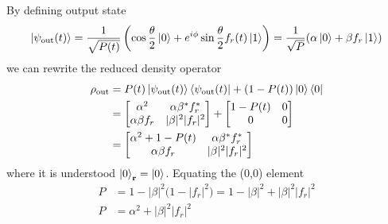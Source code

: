 \documentclass[../../../main.tex]{subfiles}
\begin{document}
By defining output state
\begin{equation*}
  \ket{\psi_{\text{out}}(t)} = \frac{1}{\sqrt{P(t)}}\left(\cos\frac{\theta}{2} \ket{0} + e^{i\phi}\sin\frac{\theta}{2}f_r(t)\ket{1}\right) = \frac{1 }{\sqrt{P}} (\alpha \ket{0 }+\beta f_r \ket{1})
\end{equation*}
we can rewrite the reduced density operator
\begin{align*}
  \rho_\text{out}
   & =  P(t) \ket{\psi_{\text{out}}(t)} \bra{\psi_{\text{out}}(t)} + (1-P(t)) \ket{0} \bra{0} \\
   & =  \begin{bmatrix}
          \alpha^2         & \alpha\beta^*  f_r^* \\
          \alpha\beta  f_r & |\beta|^2 |f_r|^2
        \end{bmatrix}  +
  \begin{bmatrix}
    1-P(t) & 0 \\
    0      & 0
  \end{bmatrix}                                                                              \\
   & =  \begin{bmatrix}
          \alpha^2 +1 - P(t) & \alpha\beta^*  f_r^* \\
          \alpha\beta  f_r   & |\beta|^2 |f_r|^2
        \end{bmatrix}
\end{align*}
where it is understood $\ket{0}_\mathbf{r} = \ket{0}$.
Equating the (0,0)  element
\begin{align*}
  P & = 1 - |\beta|^2\bigl(1 - |f_r|^2\bigr) = 1 - |\beta|^2 + |\beta|^2|f_r|^2 \\
  P & = \alpha^2 + |\beta|^2|f_r|^2
\end{align*}
\end{document}
